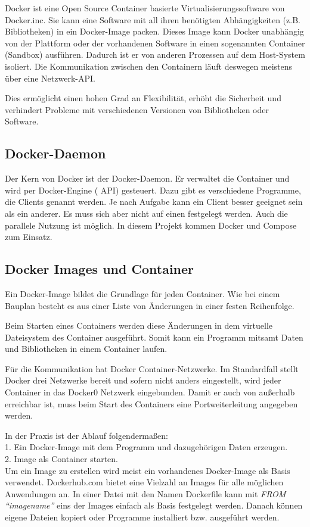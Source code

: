 Docker ist eine Open Source Container basierte Virtualisierungssoftware von Docker.inc.
Sie kann eine Software mit all ihren benötigten Abhängigkeiten (z.B. Bibliotheken) in ein Docker-Image packen. Dieses Image kann Docker unabhängig von der Plattform oder der vorhandenen Software in einen sogenannten Container (Sandbox) ausführen. Dadurch ist er von anderen Prozessen auf dem Host-System isoliert. Die Kommunikation zwischen den Containern läuft deswegen meistens über eine Netzwerk-API.

Dies ermöglicht einen hohen Grad an Flexibilität, erhöht die Sicherheit und verhindert Probleme mit verschiedenen Versionen von Bibliotheken oder Software.

\cite{dockerDummies}
\cite{dockerOverview}

\subsection{Docker-Daemon}
Der Kern von Docker ist der Docker-Daemon. Er verwaltet die Container und wird per Docker-Engine ( API) gesteuert. Dazu gibt es verschiedene Programme, die Clients genannt werden. Je nach Aufgabe kann ein Client besser geeignet sein als ein anderer. Es muss sich aber nicht auf einen festgelegt werden. Auch die parallele Nutzung ist möglich. In diesem Projekt kommen Docker und Compose zum Einsatz.
\cite{dockerDaemon}
\cite{dockerDaemon}

\subsection{Docker Images und Container}
Ein Docker-Image bildet die Grundlage für jeden Container. Wie bei einem Bauplan besteht es aus einer Liste von Änderungen in einer festen Reihenfolge.

Beim Starten eines Containers werden diese Änderungen in dem virtuelle Dateisystem des Container ausgeführt. Somit kann ein Programm mitsamt Daten und Bibliotheken in einem Container laufen.

Für die Kommunikation hat Docker Container-Netzwerke. Im Standardfall stellt Docker drei Netzwerke bereit und sofern nicht anders eingestellt, wird jeder Container in das Docker0 Netzwerk eingebunden. Damit er auch von außerhalb erreichbar ist, muss beim Start des Containers eine Portweiterleitung angegeben werden.

In der Praxis ist der Ablauf folgendermaßen: \\
1. Ein Docker-Image mit dem Programm und dazugehörigen Daten erzeugen. \\
2. Image als Container starten. \\
Um ein Image zu erstellen wird meist ein vorhandenes Docker-Image als Basis verwendet. Dockerhub.com bietet eine Vielzahl an Images für alle möglichen Anwendungen an.
In einer Datei mit den Namen Dockerfile kann mit \emph{FROM "`imagename"'} eins der Images einfach als Basis festgelegt werden. Danach können eigene Dateien kopiert oder Programme installiert bzw. ausgeführt werden.

